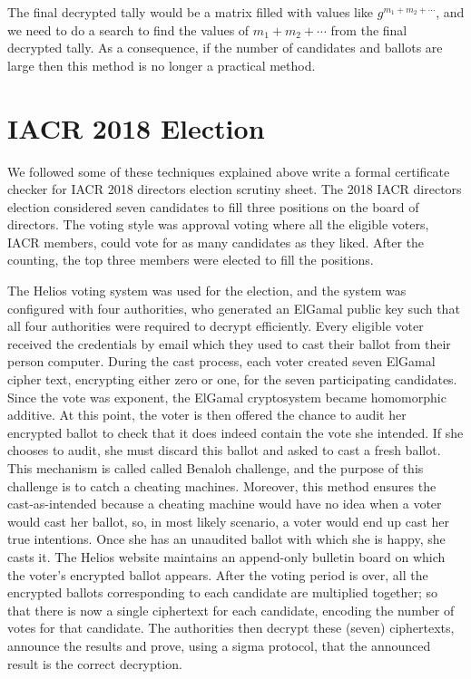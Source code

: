 \noindent 
The final decrypted tally would be a matrix filled with values like $g^{m_{1} + m_{2} + \cdots }$, and we 
need to do a search to find the values of $m_{1} + m_{2} + \cdots$ from the 
final decrypted tally. As a consequence, if the number of candidates and ballots are large then 
this method is no longer a practical method. 

\section{IACR 2018 Election}
We followed some of these techniques explained above write a formal 
certificate checker for  IACR 2018 directors election scrutiny sheet.  
The 2018  IACR directors election considered seven 
 candidates to fill three positions on the board of directors.   The voting 
 style was approval voting where all the eligible voters, IACR members, 
 could vote for as many candidates as they liked. After the counting, 
 the top three members were elected to fill the positions. 
 
The Helios voting system \citep{Helios:2016:HVS}  was used for the election, and the system
was configured with four authorities, who generated an ElGamal \citep{elgamal1985public}  public
key such that all four authorities were required to decrypt efficiently.    
Every eligible voter received the credentials by email which they used 
to cast their ballot from their person computer. 
During the cast process, each voter created seven ElGamal cipher text, 
encrypting either zero or one, for the seven participating candidates. 
Since the vote was exponent, the ElGamal cryptosystem became 
homomorphic additive. At this point,  the voter is then offered the chance to audit 
her encrypted ballot to check that
it does indeed contain the vote she intended. If she chooses to audit, she must
discard this ballot and asked to  cast 
a fresh ballot. This mechanism is called called Benaloh challenge, 
and the purpose of this challenge is to catch a cheating machines. 
Moreover, this method ensures the cast-as-intended because 
a cheating machine would have no idea when a voter would 
cast her ballot, so, in most likely scenario, a voter would 
end up cast her true intentions. Once she has an 
unaudited ballot with which she is happy, she casts it. 
The Helios website maintains an append-only bulletin board on which the voter's
encrypted ballot appears.  
After the voting period is over,
all the encrypted ballots corresponding to each candidate are multiplied together; so that there is 
now a single ciphertext for each candidate, encoding the number of votes for
that candidate.  The authorities then decrypt 
these (seven) ciphertexts, announce the results and prove,
using a sigma protocol, that the announced result is the 
correct decryption.


